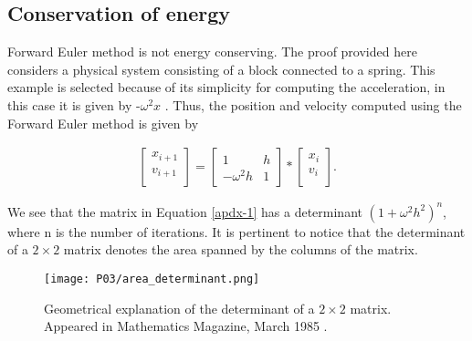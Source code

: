 \documentclass[a4paper]{article}
\begin{document}
\begin{appendix}
\section{Conservation of energy}
\label{app_eng}
Forward Euler method is not energy conserving. The proof provided here considers a physical system consisting of a block connected to a spring. This example is selected because of its simplicity for computing the acceleration, in this case it is given by -$\omega^2x$ \cite{Finite}. Thus, the position and velocity computed using the Forward Euler method is given by

\begin{align}
    \begin{bmatrix}
    x_{i+1} \\ v_{i+1} \\
  \end{bmatrix}
  =
    \begin{bmatrix}
        1 & h \\
        -\omega^2h & 1 
    \end{bmatrix}
    *
    \begin{bmatrix}
    x_i \\ v_i \\
  \end{bmatrix}.
\label{apdx-1}  
\end{align}


We see that the matrix in Equation \ref{apdx-1} has a determinant $(1 + \omega^2h^2)^{n}$, where n is the number of iterations. It is pertinent to notice that the determinant of a $2\times2$ matrix denotes the area spanned by the columns of the matrix.

\begin{figure}[H]
  \centering
  \texttt{[image: P03/area\_determinant.png]}
  \caption{Geometrical explanation of the determinant of a $2\times2$ matrix. Appeared in Mathematics Magazine, March 1985 \cite{determinant}.}
   \label{determinant}
\end{figure}


\end{appendix}
\end{document}
